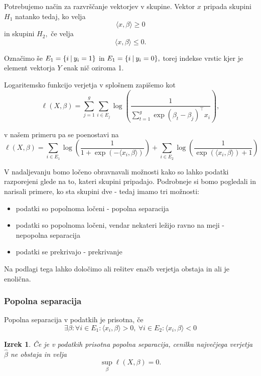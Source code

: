 \documentclass[12pt,a4paper]{amsart}
\theoremstyle{definition} %
\theoremstyle{plain} %
\newtheorem{izrek}[definicija]{Izrek}
\begin{document}
Potrebujemo način za razvrščanje vektorjev v skupine. Vektor $x$ pripada skupini $H_{1}$ natanko tedaj, ko velja
\[
    \langle x,\beta \rangle \geq 0
\]
in skupini $H_{2},$ če velja
\[
    \langle x,\beta \rangle \leq 0.
\]

Označimo še $E_{1} = \{i~\vline~y_{i} = 1\}$ in $E_{1} = \{i~\vline~y_{i} = 0\},$ torej indekse vrstic kjer je element vektorja $Y$ enak nič oziroma 1.


Logaritemsko funkcijo verjetja v splošnem zapišemo kot
\[
    \ell(X,\beta) = \sum_{j=1}^{g}\sum_{i\in E_{j}}\log\left(\frac{1}{\sum_{t=1}^{g} \exp(\beta_{t}-\beta_{j})^\top x_{i}}\right),
\]

v našem primeru pa se poenostavi na
\begin{equation*}
\ell(X,\beta) = \sum_{i\in E_{1}} \log\left(\frac{1}{1+\exp(-\langle x_{i},\beta \rangle)}\right) + \sum_{i\in E_{2}}\log\left(\frac{1}{\exp(\langle x_{i},\beta \rangle) + 1}\right)
\end{equation*}

V nadaljevanju bomo ločeno obravnavali možnosti kako so lahko podatki razporejeni glede na to, kateri skupini pripadajo. Podrobneje si bomo pogledali in narisali
primere, ko sta skupini dve - tedaj imamo tri možnosti:
\begin{itemize}
    \item podatki so popolnoma ločeni - popolna separacija
    \item podatki so popolnoma ločeni, vendar nekateri ležijo ravno na meji - nepopolna separacija
    \item podatki se prekrivajo - prekrivanje
\end{itemize}
Na podlagi tega lahko določimo ali rešitev enačb verjetja obstaja in ali je enolična.

\subsubsection{Popolna separacija}
Popolna separacija v podatkih je prisotna, če 
\[
    \exists \beta: \forall i \in E_{1}: \langle x_{i},\beta \rangle > 0,~
    \forall i \in E_{2}: \langle x_{i},\beta \rangle < 0
\]


\begin{izrek}
    Če je v podatkih prisotna popolna separacija, cenilka največjega verjetja $\hat{\beta}$ ne obstaja in velja
    \[
        \sup_{\beta} \ell(X,\beta) = 0.
    \]
\end{izrek}
\end{document}
